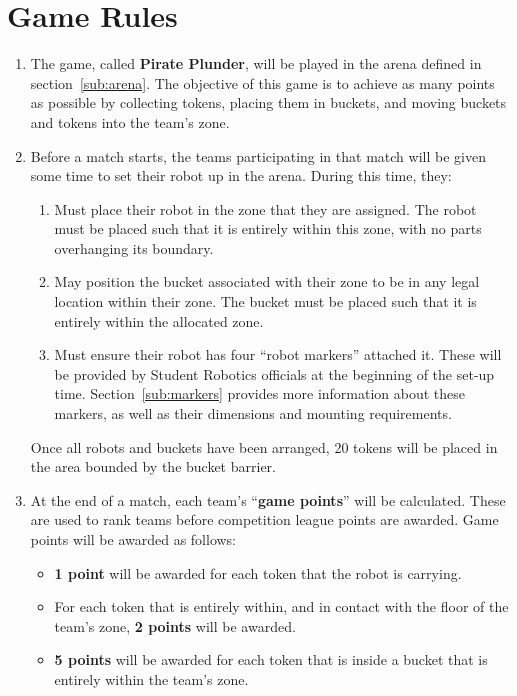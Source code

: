 \section {Game Rules}
\label{game-rules}

\begin{enumerate}
\item The game, called \textbf{Pirate Plunder}, will be played in the arena defined in section~\ref{sub:arena}.  The objective of this game is to achieve as many points as possible by collecting tokens, placing them in buckets, and moving buckets and tokens into the team's zone.

\item Before a match starts, the teams participating in that match will be given some time to set their robot up in the arena.  During this time, they:
\begin{enumerate}
  \item Must place their robot in the zone that they are assigned.  The robot must be placed such that it is entirely within this zone, with no parts overhanging its boundary.

  \item May position the bucket associated with their zone to be in any legal location within their zone.  The bucket must be placed such that it is entirely within the allocated zone.

  \item Must ensure their robot has four ``robot markers'' attached it.  These will be provided by Student Robotics officials at the beginning of the set-up time.  Section~\ref{sub:markers} provides more information about these markers, as well as their dimensions and mounting requirements.
\end{enumerate}
Once all robots and buckets have been arranged, 20 tokens will be placed in the area bounded by the bucket barrier.

\item At the end of a match, each team's ``\textbf{game points}'' will be calculated.
 These are used to rank teams before competition league points are awarded.  Game points will be awarded as follows:
\begin{itemize}
  \item \textbf{1 point} will be awarded for each token that the robot is carrying.
  \item For each token that is entirely within, and in contact with the floor of the team's zone, \textbf{2 points} will be awarded.
  \item \textbf{5 points} will be awarded for each token that is inside a bucket that is entirely within the team's zone.


\end{itemize}
\end{enumerate}
